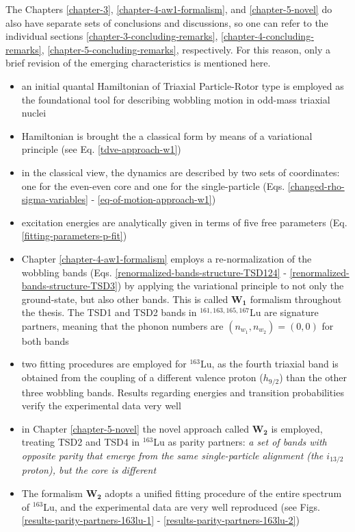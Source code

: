 The Chapters \ref{chapter-3}, \ref{chapter-4-aw1-formalism}, and \ref{chapter-5-novel} do also have separate sets of conclusions and discussions, so one can refer to the individual sections \ref{chapter-3-concluding-remarks}, \ref{chapter-4-concluding-remarks}, \ref{chapter-5-concluding-remarks}, respectively. For this reason, only a brief revision of the emerging characteristics is mentioned here.
\begin{itemize}
    \item an initial quantal Hamiltonian of Triaxial Particle-Rotor type is employed as the foundational tool for describing wobbling motion in odd-mass triaxial nuclei
    \item Hamiltonian is brought the a classical form by means of a variational principle (see Eq. \ref{tdve-approach-w1})
    \item in the classical view, the dynamics are described by two sets of coordinates: one for the even-even core and one for the single-particle (Eqs. \ref{changed-rho-sigma-variables} - \ref{eq-of-motion-approach-w1})
    \item excitation energies are analytically given in terms of five free parameters (Eq. \ref{fitting-parameters-p-fit})
    \item Chapter \ref{chapter-4-aw1-formalism} employs a re-normalization of the wobbling bands (Eqs. \ref{renormalized-bands-structure-TSD124} - \ref{renormalized-bands-structure-TSD3}) by applying the variational principle to not only the ground-state, but also other bands. This is called $\mathbf{W_1}$ formalism throughout the thesis. The TSD1 and TSD2 bands in $^{161,163,165,167}$Lu are signature partners, meaning that the phonon numbers are $(n_{w_1},n_{w_2})=(0,0)$ for both bands
    \item two fitting procedures are employed for $^{163}$Lu, as the fourth triaxial band is obtained from the coupling of a different valence proton ($h_{9/2}$) than the other three wobbling bands. Results regarding energies and transition probabilities verify the experimental data very well
    \item in Chapter \ref{chapter-5-novel} the novel approach called $\mathbf{W_2}$ is employed, treating TSD2 and TSD4 in $^{163}$Lu as parity partners: \emph{a set of bands with opposite parity that emerge from the same single-particle alignment (the $i_{13/2}$ proton), but the core is different}
    \item The formalism $\mathbf{W_2}$ adopts a unified fitting procedure of the entire spectrum of $^{163}$Lu, and the experimental data are very well reproduced (see Figs. \ref{results-parity-partners-163lu-1} - \ref{results-parity-partners-163lu-2})

\end{itemize}
